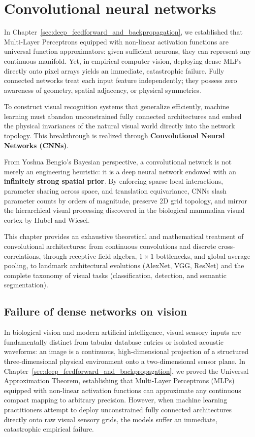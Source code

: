 \chapter{Convolutional neural networks}
\label{sec:convolutional_neural_networks}

In Chapter~\ref{sec:deep_feedforward_and_backpropagation}, we established that Multi-Layer Perceptrons equipped with non-linear activation functions are universal function approximators: given sufficient neurons, they can represent any continuous manifold. Yet, in empirical computer vision, deploying dense MLPs directly onto pixel arrays yields an immediate, catastrophic failure. Fully connected networks treat each input feature independently; they possess zero awareness of geometry, spatial adjacency, or physical symmetries.

To construct visual recognition systems that generalize efficiently, machine learning must abandon unconstrained fully connected architectures and embed the physical invariances of the natural visual world directly into the network topology. This breakthrough is realized through \textbf{Convolutional Neural Networks (CNNs)}.

From Yoshua Bengio's Bayesian perspective, a convolutional network is not merely an engineering heuristic: it is a deep neural network endowed with an \textbf{infinitely strong spatial prior}. By enforcing sparse local interactions, parameter sharing across space, and translation equivariance, CNNs slash parameter counts by orders of magnitude, preserve 2D grid topology, and mirror the hierarchical visual processing discovered in the biological mammalian visual cortex by Hubel and Wiesel.

This chapter provides an exhaustive theoretical and mathematical treatment of convolutional architectures: from continuous convolutions and discrete cross-correlations, through receptive field algebra, $1 \times 1$ bottlenecks, and global average pooling, to landmark architectural evolutions (AlexNet, VGG, ResNet) and the complete taxonomy of visual tasks (classification, detection, and semantic segmentation).

\section{Failure of dense networks on vision}
\label{sec:failure_of_fc_on_images}

In biological vision and modern artificial intelligence, visual sensory inputs are fundamentally distinct from tabular database entries or isolated acoustic waveforms: an image is a continuous, high-dimensional projection of a structured three-dimensional physical environment onto a two-dimensional sensor plane. In Chapter~\ref{sec:deep_feedforward_and_backpropagation}, we proved the Universal Approximation Theorem, establishing that Multi-Layer Perceptrons (MLPs) equipped with non-linear activation functions can approximate any continuous compact mapping to arbitrary precision. However, when machine learning practitioners attempt to deploy unconstrained fully connected architectures directly onto raw visual sensory grids, the models suffer an immediate, catastrophic empirical failure.

